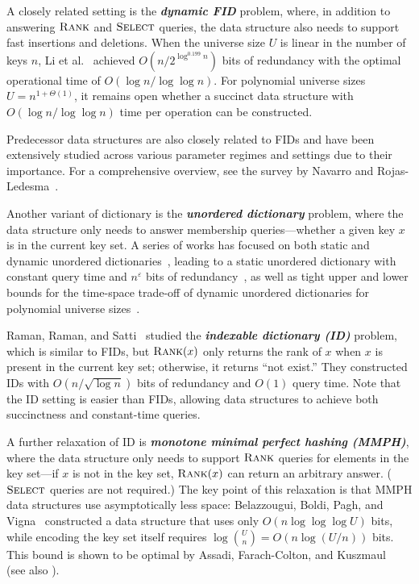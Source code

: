 \documentclass{article}
\theoremstyle{plain}
\theoremstyle{definition}  \newtheorem{definition}[theorem]{Definition}
\newcommand{\eps}{\varepsilon}
\newcommand{\rank}{\textup{\textsc{Rank}}\xspace}
\newcommand{\select}{\textup{\textsc{Select}}\xspace}
\newcommand{\defn}[1]{\emph{\textbf{#1}}}
\begin{document}
A closely related setting is the \defn{dynamic FID} problem, where, in addition to answering $\rank$ and $\select$ queries, the data structure also needs to support fast insertions and deletions. When the universe size $U$ is linear in the number of keys $n$, Li et al.~\cite{li2023dynamic} achieved $O(n / 2^{\log^{0.199} n})$ bits of redundancy with the optimal operational time of $O(\log n / \log \log n)$. For polynomial universe sizes $U = n^{1 + \Theta(1)}$, it remains open whether a succinct data structure with $O(\log n / \log \log n)$ time per operation can be constructed.

Predecessor data structures are also closely related to FIDs and have been extensively studied across various parameter regimes and settings due to their importance. For a comprehensive overview, see the survey by Navarro and Rojas-Ledesma~\cite{navarro2021predecessor}.

Another variant of dictionary is the \defn{unordered dictionary} problem, where the data structure only needs to answer membership queries---whether a given key $x$ is in the current key set. A series of works has focused on both static and dynamic unordered dictionaries~\cite{yu2020nearly,hu2025optimal,raman2003succinct,li2023tight,bender2022optimal,li2024dynamic,bender2024modern}, leading to a static unordered dictionary with constant query time and $n^{\eps}$ bits of redundancy~\cite{hu2025optimal}, as well as tight upper and lower bounds for the time-space trade-off of dynamic unordered dictionaries for polynomial universe sizes~\cite{li2023tight,bender2022optimal,li2024dynamic}.

Raman, Raman, and Satti~\cite{raman2007succinct} studied the \defn{indexable dictionary (ID)} problem, which is similar to FIDs, but $\rank(x)$ only returns the rank of $x$ when $x$ is present in the current key set; otherwise, it returns ``not exist.'' They constructed IDs with $O(n / \sqrt{\log n})$ bits of redundancy and $O(1)$ query time. Note that the ID setting is easier than FIDs, allowing data structures to achieve both succinctness and constant-time queries.

A further relaxation of ID is \defn{monotone minimal perfect hashing (MMPH)}, where the data structure only needs to support $\rank$ queries for elements in the key set---if $x$ is not in the key set, $\rank(x)$ can return an arbitrary answer. ($\select$ queries are not required.) The key point of this relaxation is that MMPH data structures use asymptotically less space: Belazzougui, Boldi, Pagh, and Vigna~\cite{belazzougui2009monotone} constructed a data structure that uses only $O(n \log \log \log U)$ bits, while encoding the key set itself requires $\log \binom{U}{n} = O(n \log (U/n))$ bits. This bound is shown to be optimal by Assadi, Farach-Colton, and Kuszmaul~\cite{assadi2024tight} (see also \cite{kosolobov2024simplified}).
\end{document}
